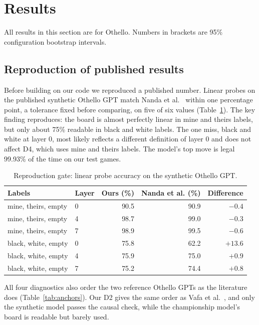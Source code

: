 \documentclass[11pt]{scrartcl}
\begin{document}
\section{Results}

All results in this section are for Othello. Numbers in brackets are 95\% configuration bootstrap intervals.

\subsection{Reproduction of published results}

Before building on our code we reproduced a published number. Linear probes on the published synthetic Othello
GPT match Nanda et al.~\cite{nanda2023emergent} within one percentage point, a tolerance fixed before
comparing, on five of six values (Table~\ref{tab:repro}). The key finding reproduces: the board is almost
perfectly linear in mine and theirs labels, but only about 75\% readable in black and white labels. The one
miss, black and white at layer 0, most likely reflects a different definition of layer 0 and does not affect
D4, which uses mine and theirs labels. The model's top move is legal 99.93\% of the time on our test games.

\begin{table}[H]
    \centering
    \small
    \begin{tabular}{llrrr}
    \toprule
    Labels & Layer & Ours (\%) & Nanda et al. (\%) & Difference \\
    \midrule
    mine, theirs, empty & 0 & 90.5 & 90.9 & $-0.4$ \\
    mine, theirs, empty & 4 & 98.7 & 99.0 & $-0.3$ \\
    mine, theirs, empty & 7 & 98.9 & 99.5 & $-0.6$ \\
    black, white, empty & 0 & 75.8 & 62.2 & $+13.6$ \\
    black, white, empty & 4 & 75.9 & 75.0 & $+0.9$ \\
    black, white, empty & 7 & 75.2 & 74.4 & $+0.8$ \\
    \bottomrule
    \end{tabular}
    \caption{Reproduction gate: linear probe accuracy on the synthetic Othello GPT.}
    \label{tab:repro}
\end{table}

All four diagnostics also order the two reference Othello GPTs as the literature does
(Table~\ref{tab:anchors}). Our D2 gives the same order as Vafa et al.~\cite{vafa2024evaluating}, and only the
synthetic model passes the causal check, while the championship model's board is readable but barely used.
\end{document}
